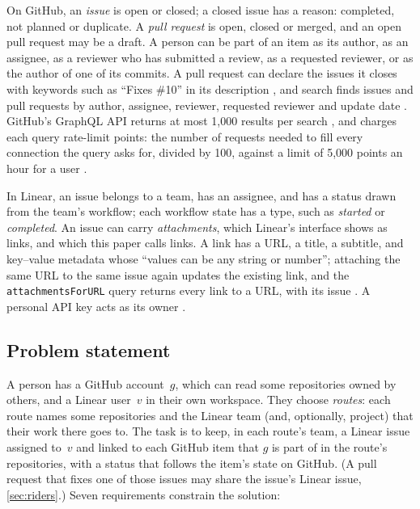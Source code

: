 \documentclass[11pt,a4paper]{article}
\newcommand{\code}[1]{\texttt{#1}}
\begin{document}
On GitHub, an \emph{issue} is open or closed; a closed issue has a reason: completed, not
planned or duplicate. A \emph{pull request} is open, closed or merged, and an open pull request
may be a draft. A person can be part of an item as its author, as an assignee, as a reviewer who
has submitted a review, as a requested reviewer, or as the author of one of its commits. A pull
request can declare the issues it closes with keywords such as \enquote{Fixes \#10} in its
description \cite{github2026linking}, and search finds issues and pull requests by author,
assignee, reviewer, requested reviewer and update date \cite{github2026searching}. GitHub's
GraphQL API \cite{graphql2025specification} returns at most 1,000 results per search
\cite{github2026publicschema}, and charges each query rate-limit points: the number of
requests needed to fill every connection the query asks for, divided by 100, against a limit
of 5,000 points an hour for a user \cite{github2026graphqlratelimits}.

In Linear, an issue belongs to a team, has an assignee, and has a status drawn from the team's
workflow; each workflow state has a type, such as \emph{started} or \emph{completed}. An issue
can carry \emph{attachments}, which Linear's interface shows as links, and which this paper
calls links. A link has a URL, a title, a subtitle, and key--value metadata whose
\enquote{values can be any string or number}; attaching the same URL to the same issue again
updates the existing link, and the \code{attachmentsForURL} query returns every link to a URL,
with its issue \cite{linear2026attachments, linear2026schema}. A personal API key acts as its
owner \cite{linear2026gettingstarted}.

\subsection{Problem statement}

A person has a GitHub account~$g$, which can read some repositories owned by others, and a
Linear user~$v$ in their own workspace. They choose \emph{routes}: each route names some
repositories and the Linear team (and, optionally, project) that their work there goes to.
The task is to keep, in each route's team, a Linear issue assigned to~$v$ and linked to each
GitHub item that $g$ is part of in the route's repositories, with a status that follows the
item's state on GitHub. (A pull request that fixes one of those issues may share the issue's
Linear issue, \cref{sec:riders}.) Seven requirements constrain the solution:
\end{document}
